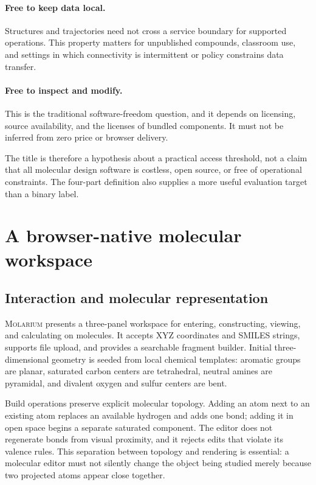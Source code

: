 \documentclass[11pt]{article}
\newcommand{\molarium}{\textsc{Molarium}}
\begin{document}
\paragraph{Free to keep data local.}
Structures and trajectories need not cross a service boundary for supported
operations.
This property matters for unpublished compounds, classroom use, and settings in
which connectivity is intermittent or policy constrains data transfer.

\paragraph{Free to inspect and modify.}
This is the traditional software-freedom question, and it depends on licensing,
source availability, and the licenses of bundled components.
It must not be inferred from zero price or browser delivery.

The title is therefore a hypothesis about a practical access threshold, not a
claim that all molecular design software is costless, open source, or free of
operational constraints.
The four-part definition also supplies a more useful evaluation target than a
binary label.

\section{A browser-native molecular workspace}
\label{sec:system}

\subsection{Interaction and molecular representation}

\molarium{} presents a three-panel workspace for entering, constructing, viewing,
and calculating on molecules.
It accepts XYZ coordinates and SMILES strings, supports file upload, and provides
a searchable fragment builder.
Initial three-dimensional geometry is seeded from local chemical templates:
aromatic groups are planar, saturated carbon centers are tetrahedral, neutral
amines are pyramidal, and divalent oxygen and sulfur centers are bent.

Build operations preserve explicit molecular topology.
Adding an atom next to an existing atom replaces an available hydrogen and adds
one bond; adding it in open space begins a separate saturated component.
The editor does not regenerate bonds from visual proximity, and it rejects edits
that violate its valence rules.
This separation between topology and rendering is essential: a molecular editor
must not silently change the object being studied merely because two projected
atoms appear close together.
\end{document}

